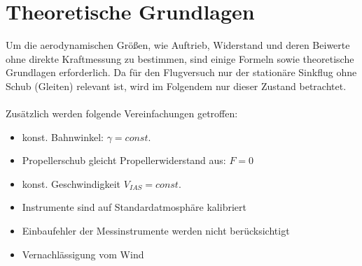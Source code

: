 \chapter{Theoretische Grundlagen}
\label{chapter:theorie}
Um die aerodynamischen Größen, wie Auftrieb, Widerstand und deren Beiwerte ohne direkte Kraftmessung zu bestimmen, sind einige Formeln sowie theoretische Grundlagen erforderlich. Da für den Flugversuch nur der stationäre Sinkflug ohne Schub (Gleiten) relevant ist, wird im Folgendem nur dieser Zustand betrachtet. \\ \\
Zusätzlich werden folgende Vereinfachungen getroffen:
\begin{itemize}
	\item konst. Bahnwinkel: $\gamma = const.$ 
	\item Propellerschub gleicht Propellerwiderstand aus: $F=0$
	\item konst. Geschwindigkeit $V_{IAS} = const.$
	\item Instrumente sind auf Standardatmosphäre kalibriert
	\item Einbaufehler der Messinstrumente werden nicht berücksichtigt
	\item Vernachlässigung vom Wind
\end{itemize}

